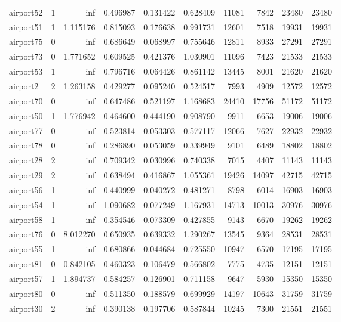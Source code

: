 \begin{longtable}{|l|r|r|r|r|r|r|r|r|r|}
airport52 & 1 & inf & 0.496987 & 0.131422 & 0.628409 & 11081 & 7842 & 23480 & 23480 \\
airport51 & 1 & 1.115176 & 0.815093 & 0.176638 & 0.991731 & 12601 & 7518 & 19931 & 19931 \\
airport75 & 0 & inf & 0.686649 & 0.068997 & 0.755646 & 12811 & 8933 & 27291 & 27291 \\
airport73 & 0 & 1.771652 & 0.609525 & 0.421376 & 1.030901 & 11096 & 7423 & 21533 & 21533 \\
airport53 & 1 & inf & 0.796716 & 0.064426 & 0.861142 & 13445 & 8001 & 21620 & 21620 \\
airport2 & 2 & 1.263158 & 0.429277 & 0.095240 & 0.524517 & 7993 & 4909 & 12572 & 12572 \\
airport70 & 0 & inf & 0.647486 & 0.521197 & 1.168683 & 24410 & 17756 & 51172 & 51172 \\
airport50 & 1 & 1.776942 & 0.464600 & 0.444190 & 0.908790 & 9911 & 6653 & 19006 & 19006 \\
airport77 & 0 & inf & 0.523814 & 0.053303 & 0.577117 & 12066 & 7627 & 22932 & 22932 \\
airport78 & 0 & inf & 0.286890 & 0.053059 & 0.339949 & 9101 & 6489 & 18802 & 18802 \\
airport28 & 2 & inf & 0.709342 & 0.030996 & 0.740338 & 7015 & 4407 & 11143 & 11143 \\
airport29 & 2 & inf & 0.638494 & 0.416867 & 1.055361 & 19426 & 14097 & 42715 & 42715 \\
airport56 & 1 & inf & 0.440999 & 0.040272 & 0.481271 & 8798 & 6014 & 16903 & 16903 \\
airport54 & 1 & inf & 1.090682 & 0.077249 & 1.167931 & 14713 & 10013 & 30976 & 30976 \\
airport58 & 1 & inf & 0.354546 & 0.073309 & 0.427855 & 9143 & 6670 & 19262 & 19262 \\
airport76 & 0 & 8.012270 & 0.650935 & 0.639332 & 1.290267 & 13545 & 9364 & 28531 & 28531 \\
airport55 & 1 & inf & 0.680866 & 0.044684 & 0.725550 & 10947 & 6570 & 17195 & 17195 \\
airport81 & 0 & 0.842105 & 0.460323 & 0.106479 & 0.566802 & 7775 & 4735 & 12151 & 12151 \\
airport57 & 1 & 1.894737 & 0.584257 & 0.126901 & 0.711158 & 9647 & 5930 & 15350 & 15350 \\
airport80 & 0 & inf & 0.511350 & 0.188579 & 0.699929 & 14197 & 10643 & 31759 & 31759 \\
airport30 & 2 & inf & 0.390138 & 0.197706 & 0.587844 & 10245 & 7300 & 21551 & 21551 \\

\end{longtable}
